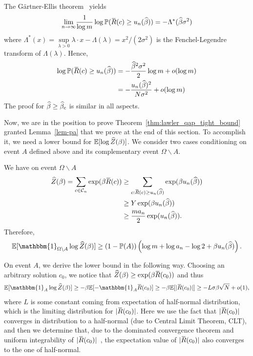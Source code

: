 The G\"{a}rtner-Ellis theorem~\citep[Theorem 2.3.6]{dembo2009large} yields
\begin{equation}
\underset{n\to\infty}{\lim}\frac{1}{\log m}\log{\mathbb{P}}(\mspace{2mu}\overline{\mspace{-2mu}R\mspace{-2mu}}\mspace{2mu}(c)\geq u_n(\widehat{\beta}))=-\Lambda^*(\widehat{\beta}\sigma^2)
\end{equation}
where $\Lambda^*(x)=\underset{\lambda>0}{\sup}\lambda\cdot
x-\Lambda(\lambda)=x^2/\left(2\sigma^2\right)$ is the Fenchel-Legendre transform
of $\Lambda(\lambda)$.
%
Hence,
\begin{align}
\log{\mathbb{P}}(\mspace{2mu}\overline{\mspace{-2mu}R\mspace{-2mu}}\mspace{2mu}(c)\geq u_n(\widehat{\beta})) &= -\frac{\widehat{\beta}^2\sigma^2}{2}\log m + o(\log m)\\
&= -\frac{u_n(\widehat{\beta})^2}{N\sigma^2} + o(\log m)
\end{align}
The proof for $\widehat{\beta}\geq\widehat{\beta}_c$ is similar in all aspects.
\QEDA
\par
\medskip
Now, we are in the position to prove Theorem~\ref{thm:lawler_qap_tight_bound}
granted Lemma~\ref{lem-pa} that we prove at the end of this section.
To accomplish it, we need a lower bound for
${\mathbb{E}}[\log \widehat{Z}(\beta)]$. We consider two cases conditioning on
event $A$ defined above and its complementary event $\Omega\backslash A$.
%

We have on event $\Omega\backslash A$
\begin{align}
\widehat{Z}(\beta)=\sum_{c\in{\cal C}_n}\exp(\beta\mspace{2mu}\overline{\mspace{-2mu}R\mspace{-2mu}}\mspace{2mu}(c))
&\geq \sum_{c:\mspace{2mu}\overline{\mspace{-2mu}R\mspace{-2mu}}\mspace{2mu}(c)\geq u_n(\widehat{\beta})}\exp(\beta u_n(\widehat{\beta}))\\
&\geq Y \exp(\beta u_n(\widehat{\beta}))\\
&\geq \frac{ma_n}{2}\exp(u_n(\widehat{\beta})).
\end{align}
Therefore,
\begin{equation}\label{lower_for_complement}
  \E[\mathbbm{1}_{\Omega\backslash A}\log\wz(\beta)]
    \geq(1-\Prob(A))\left(\log m +\log a_n - \log 2 + \beta u_n(\hb)\right).
\end{equation}

On event $A$, we derive the lower bound in the following way. Choosing an
arbitrary solution $c_0$, we notice that $\widehat{Z}(\beta)\geq\exp(\beta\mspace{2mu}\overline{\mspace{-2mu}R\mspace{-2mu}}\mspace{2mu}(c_0))$ and
thus
\begin{equation}\label{lower_for_a}
  \E[\mathbbm{1}_A\log\wz(\beta)]
    \geq -\beta\E[-\mathbbm{1}_A\hr(c_0)]\geq -\beta\E[|\hr(c_0)|] 
    \geq -L\sigma\beta\sqrt{N} + o(1),
\end{equation}
where $L$ is some constant coming from expectation of half-normal distribution,
which is the limiting distribution for $|\mspace{2mu}\overline{\mspace{-2mu}R\mspace{-2mu}}\mspace{2mu}(c_0)|$. Here we use the fact that
$|\mspace{2mu}\overline{\mspace{-2mu}R\mspace{-2mu}}\mspace{2mu}(c_0)|$ converges in distribution to a half-normal (due to Central Limit
Theorem, CLT), and then we determine that, due to the dominated convergence
theorem and uniform integrability of $|\mspace{2mu}\overline{\mspace{-2mu}R\mspace{-2mu}}\mspace{2mu}(c_0)|$~\cite[Ch.~XVI.7]{feller}, the
expectation value of $|\mspace{2mu}\overline{\mspace{-2mu}R\mspace{-2mu}}\mspace{2mu}(c_0)|$ also converges to the one of half-normal.

